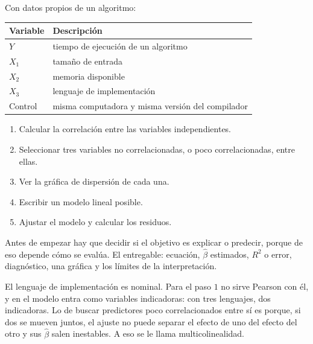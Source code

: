 \documentclass[11pt,letterpaper]{article}
\begin{document}
Con datos propios de un algoritmo:

\begin{center}
\small
\begin{tabular}{ll}
    \toprule
    \textbf{Variable} & \textbf{Descripción} \\
    \midrule
    $Y$     & tiempo de ejecución de un algoritmo \\
    $X_1$   & tamaño de entrada \\
    $X_2$   & memoria disponible \\
    $X_3$   & lenguaje de implementación \\
    Control & misma computadora y misma versión del compilador \\
    \bottomrule
\end{tabular}
\end{center}

\begin{enumerate}[itemsep=0.3em]
    \item Calcular la correlación entre las variables independientes.
    \item Seleccionar tres variables no correlacionadas, o poco
          correlacionadas, entre ellas.
    \item Ver la gráfica de dispersión de cada una.
    \item Escribir un modelo lineal posible.
    \item Ajustar el modelo y calcular los residuos.
\end{enumerate}

Antes de empezar hay que decidir si el objetivo es explicar o predecir,
porque de eso depende cómo se evalúa. El entregable: ecuación,
$\hat{\beta}$ estimados, $R^2$ o error, diagnóstico, una gráfica y los
límites de la interpretación.

\begin{ojo}
    El lenguaje de implementación es nominal. Para el paso $1$ no sirve
    Pearson con él, y en el modelo entra como variables indicadoras:
    con tres lenguajes, dos indicadoras. Lo de buscar predictores poco
    correlacionados entre sí es porque, si dos se mueven juntos, el
    ajuste no puede separar el efecto de uno del efecto del otro y sus
    $\hat{\beta}$ salen inestables. A eso se le llama
    multicolinealidad.
\end{ojo}


\newpage
\end{document}
